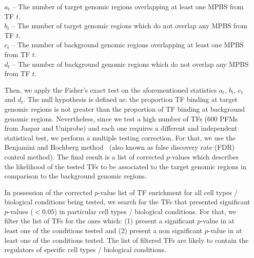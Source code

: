 \vspace{0.3cm}
\noindent
$a_t$ -- The number of target genomic regions overlapping at least one MPBS from TF $t$. \vspace{0.2cm} \\
$b_t$ -- The number of target genomic regions which do not overlap any MPBS from TF $t$. \vspace{0.2cm} \\
$c_t$ -- The number of background genomic regions overlapping at least one MPBS from TF $t$. \vspace{0.2cm} \\
$d_t$ -- The number of background genomic regions which do not overlap any MPBS from TF $t$.\\
\vspace{0.3cm}

Then, we apply the Fisher's exact test on the aforementioned statistics $a_t$, $b_t$, $c_t$ and $d_t$. The null hypothesis is defined as: the proportion TF binding at target genomic regions is not greater than the proportion of TF binding at background genomic regions. Nevertheless, since we test a high number of TFs (\approxy$600$ PFMs from Jaspar and Uniprobe) and each one requires a different and independent statistical test, we perform a multiple testing correction. For that, we use the Benjamini and Hochberg method~\citep{benjamini1995} (also known as false discovery rate (FDR) control method). The final result is a list of corrected $p$-values which describes the likelihood of the tested TFs to be associated to the target genomic regions in comparison to the background genomic regions.

In possession of the corrected $p$-value list of TF enrichment for all cell types / biological conditions being tested, we search for the TFs that presented significant $p$-values ($< 0.05$) in particular cell types / biological conditions. For that, we filter the list of TFs for the ones which: (1) present a significant $p$-value in at least one of the conditions tested and (2) present a non significant $p$-value in at least one of the conditions tested. The list of filtered TFs are likely to contain the regulators of specific cell types / biological conditions.

